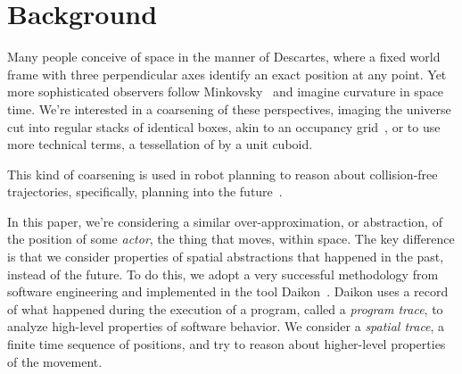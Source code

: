 \section{Background}
\label{sec:background}

Many people conceive of space in the manner of Descartes, where a fixed world frame with three perpendicular axes identify an exact position at any point.  
Yet more sophisticated observers follow Minkovsky~\cite{minkowski1952space} and imagine curvature in space time.
We're interested in a coarsening of these perspectives, imaging the universe cut into regular stacks of identical boxes, akin to an occupancy grid~\cite{moravec1985high}, or to use more technical terms, a tessellation of \rthree by a unit cuboid.



This kind of coarsening is used in robot planning to reason about collision-free trajectories, specifically, planning into the future~\cite{siegwart2011introduction}.

In this paper, we're considering a similar over-approximation, or abstraction, of the position of some \emph{actor}, the thing that moves, within space. 
The key difference is that we consider properties of spatial abstractions that happened in the past, instead of the future.
To do this, we adopt a very successful methodology from software engineering and implemented in the tool Daikon~\cite{kataoka2001automated}.
Daikon uses a record of what happened during the execution of a program, called a \emph{program trace}, to analyze high-level properties of software behavior.
We consider a \emph{spatial trace}, a finite time sequence of positions, and try to reason about higher-level properties of the movement.


